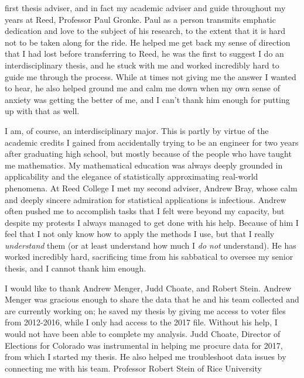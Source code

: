 \documentclass[12pt,twoside]{reedthesis}
\begin{document}
\begin{preface}
      first thesis adviser, and in fact my academic adviser and guide
      throughout my years at Reed, Professor Paul Gronke. Paul as a person
      transmits emphatic dedication and love to the subject of his research,
      to the extent that it is hard not to be taken along for the ride. He
      helped me get back my sense of direction that I had lost before
      transferring to Reed, he was the first to suggest I do an
      interdisciplinary thesis, and he stuck with me and worked incredibly
      hard to guide me through the process. While at times not giving me the
      answer I wanted to hear, he also helped ground me and calm me down when
      my own sense of anxiety was getting the better of me, and I can't thank
      him enough for putting up with that as well. \par I am, of course, an
      interdisciplinary major. This is partly by virtue of the academic
      credits I gained from accidentally trying to be an engineer for two
      years after graduating high school, but mostly because of the people who
      have taught me mathematics. My mathematical education was always deeply
      grounded in applicability and the elegance of statistically
      approximating real-world phenomena. At Reed College I met my second
      adviser, Andrew Bray, whose calm and deeply sincere admiration for
      statistical applications is infectious. Andrew often pushed me to
      accomplish tasks that I felt were beyond my capacity, but despite my
      protests I always managed to get done with his help. Because of him I
      feel that I not only know how to apply the methods I use, but that I
      really \emph{understand} them (or at least understand how much I
      \emph{do not} understand). He has worked incredibly hard, sacrificing
      time from his sabbatical to oversee my senior thesis, and I cannot thank
      him enough. \par I would like to thank Andrew Menger, Judd Choate, and
      Robert Stein. Andrew Menger was gracious enough to share the data that
      he and his team collected and are currently working on; he saved my
      thesis by giving me access to voter files from 2012-2016, while I only
      had access to the 2017 file. Without his help, I would not have been
      able to complete my analysis. Judd Choate, Director of Elections for
      Colorado was instrumental in helping me procure data for 2017, from
      which I started my thesis. He also helped me troubleshoot data issues by
      connecting me with his team. Professor Robert Stein of Rice University

\end{preface}
\end{document}

